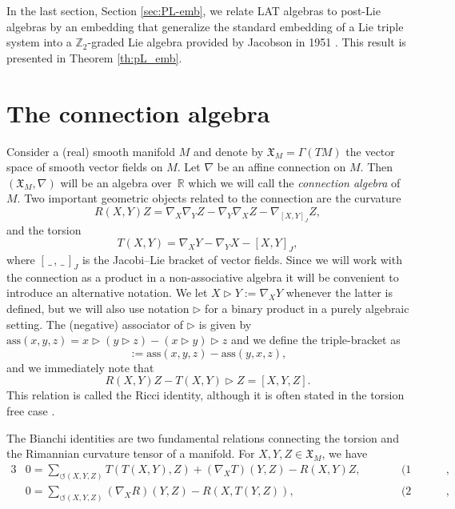 \documentclass[10pt,a4paper]{amsart}
\newcommand{\noarg}{\,\_\,}
\numberwithin{equation}{section}
\begin{document}
In the last section, Section \ref{sec:PL-emb}, we relate LAT algebras to post-Lie algebras by an embedding that generalize the standard embedding of a Lie triple system into a $\mathbb{Z}_2$-graded Lie algebra provided by Jacobson in 1951 \cite{Jacobson1951}. This result is presented in Theorem \ref{th:pL_emb}.

\section{The connection algebra}\label{sec2}

Consider a (real) smooth manifold $M$ and denote by $\mathfrak{X}_M= \Gamma(TM)$ the vector space of smooth vector fields on $M$. Let $\nabla$ be an affine connection on $M$. Then $(\mathfrak{X}_M, \nabla)$ will be an algebra over~$\mathbb{R}$ which we will call the \textit{connection algebra} of $M$. Two important geometric objects related to the connection are the curvature
\begin{equation*}%
 R(X,Y)Z = \nabla_X \nabla_Y Z - \nabla_Y \nabla_X Z - \nabla_{[X,Y]_J} Z,
\end{equation*}
and the torsion
\begin{equation*}%
 T(X,Y) = \nabla_X Y - \nabla_Y X - [X,Y]_J,
\end{equation*}
where $[\noarg , \noarg ]_J$ is the Jacobi--Lie bracket of vector fields. Since we will work with the connection as a product in a non-associative algebra it will be convenient to introduce an alternative notation. We let $X \rhd Y := \nabla_X Y$ whenever the latter is defined, but we will also use notation $\rhd$ for a binary product in a purely algebraic setting. The (negative) associator of $\rhd$ is given by $\text{ass}(x,y,z)= x \rhd (y \rhd z) - (x \rhd y ) \rhd z$ and we define the triple-bracket as
\begin{equation*}%
 [x,y,z] := \text{ass}(x,y,z) - \text{ass}(y,x,z),
\end{equation*}
and we immediately note that
\begin{equation*}%
 R(X,Y)Z - T(X,Y) \rhd Z = [X,Y,Z].
\end{equation*}
This relation is called the Ricci identity, although it is often stated in the torsion free case \cite{Besse_1987, Ricci_1900}.

The Bianchi identities are two fundamental relations connecting the torsion and the Rimannian curvature tensor of a manifold. For $X,Y,Z \in \mathfrak{X}_M$, we have
\begin{alignat*}{3}%
& 0= \sum_{\circlearrowleft (X,Y,Z)} T(T(X,Y),Z) + (\nabla_X T)(Y,Z) - R(X,Y)Z , \qquad && \mbox{(1 Bianchi)},&\\
&0= \sum_{\circlearrowleft (X,Y,Z)} (\nabla_X R)(Y,Z) - R(X,T(Y,Z)) , && \mbox{(2 Bianchi)},& %
\end{alignat*}
\end{document}
